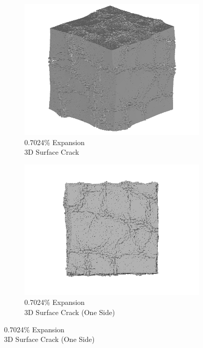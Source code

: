 \begin{figure}[ht!]
    \begin{subfigure}{.5\textwidth}
      \centering
      \includegraphics[width=0.5\linewidth]{Files/exp_3D/ASR/A30P25_3_3d.png}
      \caption{0.7024\% Expansion\\3D Surface Crack}
    \end{subfigure}%
    \begin{subfigure}{.5\textwidth}
      \centering
      \includegraphics[width=0.5\linewidth]{Files/exp_3D/ASR/A30P25_3_3ds.png}
      \caption{0.7024\% Expansion\\3D Surface Crack (One Side)}
    \end{subfigure}%


\end{figure}
